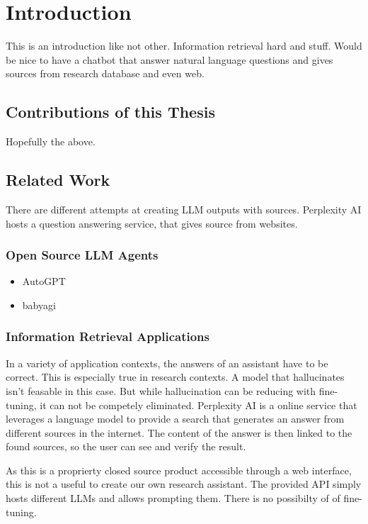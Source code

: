\documentclass[english, version-2022-01]{uzl-thesis}
\begin{document}
\chapter{Introduction}

This is an introduction like not other. Information retrieval hard and stuff.
Would be nice to have a chatbot that answer natural language questions and gives sources from research database and even web.

\section{Contributions of this Thesis}

Hopefully the above.

\section{Related Work}

There are different attempts at creating LLM outputs with sources. Perplexity AI hosts a question answering service, that gives source from websites.

\subsection{Open Source LLM Agents}
\begin{itemize}
    \item AutoGPT
    \item babyagi
\end{itemize}
\subsection{Information Retrieval Applications}

In a variety of application contexts,
the answers of an assistant have to be correct.
This is especially true in research contexts.
A model that hallucinates isn't feasable in this case.
But while hallucination can be reducing with fine-tuning,
it can not be competely eliminated.
Perplexity AI is a online service that leverages a language model
to provide a search that generates an answer from different sources in the internet.
The content of the answer is then linked to the found sources,
so the user can see and verify the result.

As this is a proprierty closed source product accessible through a web interface,
this is not a useful to create our own research assistant.
The provided API simply hosts different LLMs and allows prompting them.
There is no possibilty of of fine-tuning.
\end{document}
